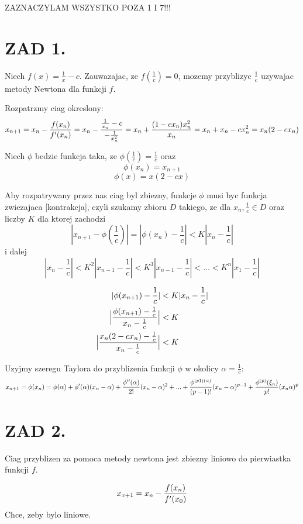 \documentclass{article}[13pt]
\begin{document}
    ZAZNACZYLAM WSZYSTKO POZA 1 I 7!!!

    \section*{ZAD 1.}
    
    Niech $f(x)=\frac 1x-c$. Zauwazajac, ze $f(\frac1c)=0$, mozemy przyblizyc $\frac1c$ uzywajac metody Newtona dla funkcji $f$.
    \medskip

    Rozpatrzmy ciag okreslony:
    $$x_{n+1}=x_n-{f(x_n)\over f'(x_n)}=x_n-{\frac 1{x_n}-c\over -\frac 1{x_n^2}}=x_n+{(1-cx_n)x_n^2\over x_n}=x_n+x_n-cx_n^2=x_n(2-cx_n)$$

    Niech $\phi$ bedzie funkcja taka, ze $\phi(\frac 1c)=\frac 1c$ oraz
    $$\phi(x_n)=x_{n+1}$$
    $$\phi(x)=x(2-cx)$$

    Aby rozpatrywany przez nas ciag byl zbiezny, funkcje $\phi$ musi byc funkcja zwiezajaca [kontrakcja], czyli szukamy zbioru $D$ takiego, ze dla $x_{n},\frac1c\in D$ oraz liczby $K$ dla ktorej zachodzi
    $$|x_{n+1}-\phi(\frac1c)|=|\phi(x_n)-\frac1c|<K|x_n-\frac1c|$$
    i dalej
    $$|x_{n}-\frac1c|<K^2|x_{n-1}-\frac1c|<K^3|x_{n-1}-\frac1c|<...<K^n|x_1-\frac1c|$$

    \begin{align*}
        |\phi(x_{n+1})-\frac1c|&<K|x_n-\frac1c|\\
        \Big |{\phi(x_{n+1})-\frac1c\over x_n-\frac1c}\Big |&<K\\
        \Big |{x_n(2-cx_n)-\frac1c\over x_n-\frac1c}\Big |&<K
    \end{align*}


    Uzyjmy szeregu Taylora do przyblizenia funkcji $\phi$ w okolicy $\alpha=\frac1c$:
    \begin{align*}
        x_{n+1}=\phi(x_n)=\phi(\alpha)+\phi'(\alpha)(x_n-\alpha)+{\phi''(\alpha)\over 2!}(x_n-\alpha)^2+...+{\phi^{(p1)(\alpha)}\over (p-1)!}(x_n-\alpha)^{p-1}+{\phi^{(p)}(\xi_n)\over p!}(x_n\alpha)^p
    \end{align*}


    \section*{ZAD 2.}

    Ciag przyblizen za pomoca metody newtona jest zbiezny liniowo do pierwiastka funkcji $f$.
    
    $$x_{x+1}=x_n-{f(x_n)\over f'(x_0)}$$
    Chce, zeby bylo liniowe.
    \medskip
\end{document}
